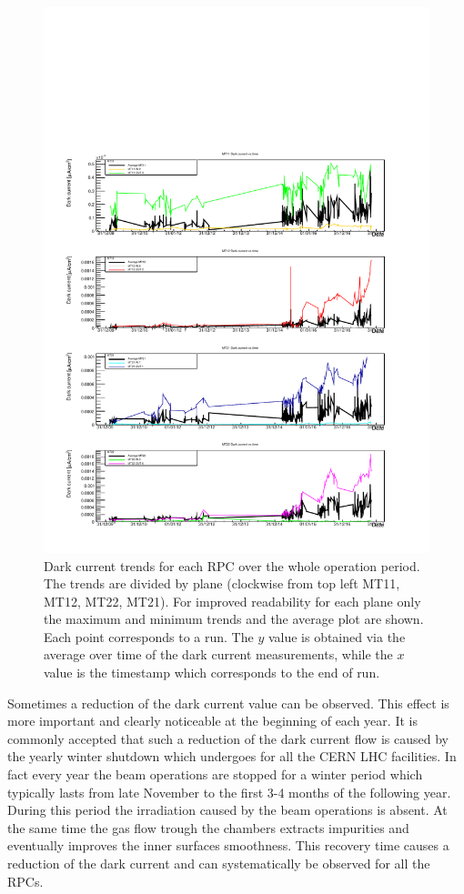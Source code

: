\begin{figure}[!t]
\begin{center}
\includegraphics[width=0.95\linewidth]{Chapters/Performance/Figs/iDark4PlanesMM.pdf}
\caption{Dark current trends for each RPC over the whole operation period. The trends are divided by plane (clockwise from top left MT11, MT12, MT22, MT21). For improved readability for each plane only the maximum and minimum trends and the average plot are shown. Each point corresponds to a run. The $y$ value is obtained via the average over time of the dark current measurements, while the $x$ value is the timestamp which corresponds to the end of run.}
\label{fig:iDark4Planes}
\end{center}
\end{figure}

Sometimes a reduction of the dark current value can be observed.
This effect is more important and clearly noticeable at the beginning of each year.
It is commonly accepted that such a reduction of the dark current flow is caused by the yearly winter shutdown which undergoes for all the CERN LHC facilities.
In fact every year the beam operations are stopped for a winter period which typically lasts from late November to the first 3-4 months of the following year.
During this period the irradiation caused by the beam operations is absent.
At the same time the gas flow trough the chambers extracts impurities and eventually improves the inner surfaces smoothness.
This recovery time causes a reduction of the dark current and can systematically be observed for all the RPCs.


